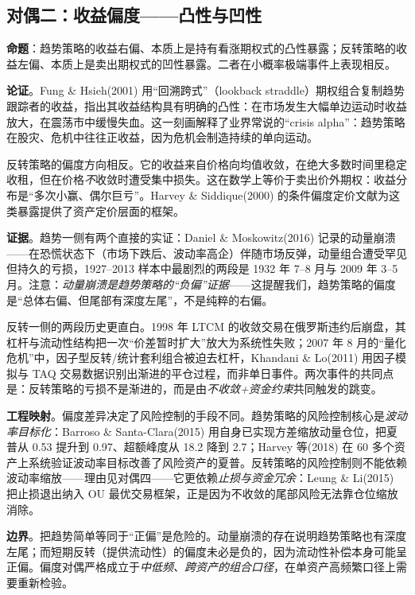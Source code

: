 \subsection{对偶二：收益偏度——凸性与凹性}

\textbf{命题}：趋势策略的收益右偏、本质上是持有看涨期权式的凸性暴露；反转策略的收益左偏、本质上是卖出期权式的凹性暴露。二者在小概率极端事件上表现相反。

\textbf{论证}。Fung \& Hsieh(2001) 用“回溯跨式”（lookback straddle）期权组合复制趋势跟踪者的收益，指出其收益结构具有明确的凸性：在市场发生大幅单边运动时收益放大，在震荡市中缓慢失血\cite{funghsieh2001}。这一刻画解释了业界常说的“crisis alpha”：趋势策略在股灾、危机中往往正收益，因为危机会制造持续的单向运动。

反转策略的偏度方向相反。它的收益来自价格向均值收敛，在绝大多数时间里稳定收租，但在价格\emph{不}收敛时遭受集中损失。这在数学上等价于卖出价外期权：收益分布是“多次小赢、偶尔巨亏”。Harvey \& Siddique(2000) 的条件偏度定价文献为这类暴露提供了资产定价层面的框架\cite{harveysiddique2000}。

\textbf{证据}。趋势一侧有两个直接的实证：Daniel \& Moskowitz(2016) 记录的动量崩溃——在恐慌状态下（市场下跌后、波动率高企）伴随市场反弹，动量组合遭受罕见但持久的亏损，1927--2013 样本中最剧烈的两段是 1932 年 7--8 月与 2009 年 3--5 月\cite{danielmoskowitz2016}。注意：\emph{动量崩溃是趋势策略的“负偏”证据}——这提醒我们，趋势策略的偏度是“总体右偏、但尾部有深度左尾”，不是纯粹的右偏。

反转一侧的两段历史更直白。1998 年 LTCM 的收敛交易在俄罗斯违约后崩盘，其杠杆与流动性结构把一次“价差暂时扩大”放大为系统性失败\cite{lowenstein2000,jorion2000}；2007 年 8 月的“量化危机”中，因子型反转/统计套利组合被迫去杠杆，Khandani \& Lo(2011) 用因子模拟与 TAQ 交易数据识别出渐进的平仓过程，而非单日事件\cite{khandanilo2011}。两次事件的共同点是：反转策略的亏损不是渐进的，而是由\emph{不收敛+资金约束}共同触发的跳变。

\textbf{工程映射}。偏度差异决定了风险控制的手段不同。趋势策略的风险控制核心是\emph{波动率目标化}：Barroso \& Santa-Clara(2015) 用自身已实现方差缩放动量仓位，把夏普从 0.53 提升到 0.97、超额峰度从 18.2 降到 2.7\cite{barroso2015}；Harvey 等(2018) 在 60 多个资产上系统验证波动率目标改善了风险资产的夏普\cite{harvey2018}。反转策略的风险控制则不能依赖波动率缩放——理由见对偶四——它更依赖\emph{止损与资金冗余}：Leung \& Li(2015) 把止损退出纳入 OU 最优交易框架，正是因为不收敛的尾部风险无法靠仓位缩放消除\cite{leungli2015}。

\textbf{边界}。把趋势简单等同于“正偏”是危险的。动量崩溃的存在说明趋势策略也有深度左尾；而短期反转（提供流动性）的偏度未必是负的，因为流动性补偿本身可能呈正偏。偏度对偶严格成立于\emph{中低频、跨资产的组合口径}，在单资产高频繁口径上需要重新检验。


